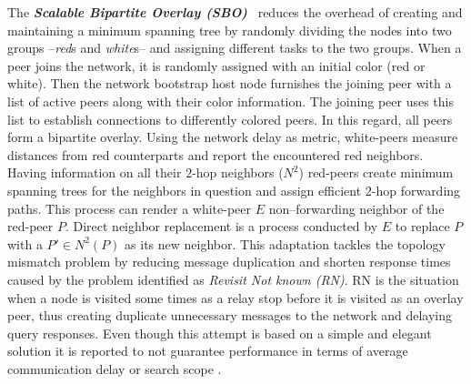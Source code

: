 The \textbf{\emph{Scalable Bipartite Overlay (SBO)}}~\cite{LXN2007} 
reduces the overhead of creating
and maintaining a minimum spanning tree 
by randomly dividing the nodes into
two groups --\emph{red}s and \emph{white}s-- 
and assigning different tasks to the two groups.
When a peer joins the network, it is randomly assigned with an initial
color (red or white).
Then the network bootstrap host node furnishes the joining peer with a list
of active peers along with their color information. 
The joining peer uses this list to 
establish connections to differently colored peers. 
In this regard, all peers form a bipartite overlay. 
Using the network delay as metric, white-peers 
measure distances from red counterparts
and report the encountered red neighbors.
Having information on all their $2$-hop neighbors 
($N^2$)
red-peers create minimum spanning trees for the neighbors in question and
assign efficient $2$-hop forwarding paths. This process can render a white-peer
$E$ non--forwarding neighbor of the red-peer $P$. Direct neighbor
replacement is a process conducted by $E$ to replace $P$ with a
$P' \in N^2(P)$ as its new neighbor. This adaptation tackles the
topology mismatch problem by reducing message duplication and shorten response
times caused by the problem identified as \emph{Revisit Not known (RN)}. RN is
the situation when a node is visited some times as a relay stop before it is
visited as an overlay peer, thus creating duplicate unnecessary messages to the
network and delaying query responses.
Even though this attempt is based on a simple and elegant solution it is
reported to not guarantee performance in terms of average communication delay
or search scope \cite{HLH2009}.
%
%
%
